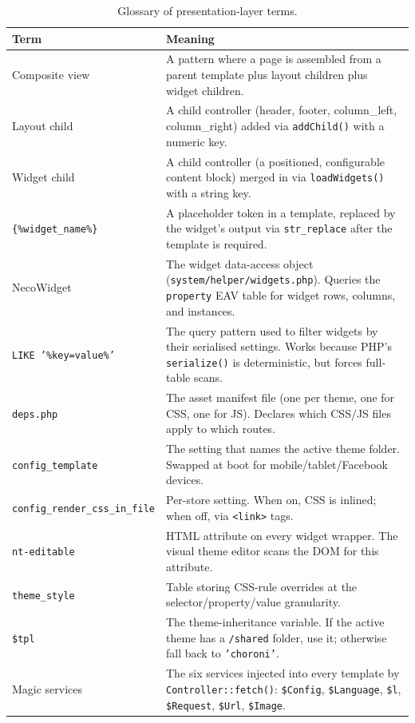 \documentclass[11pt,a4paper]{article}
\begin{document}
\begin{table}[htbp]
\centering
\caption{Glossary of presentation-layer terms.}\label{tab:glossary-v3}
\footnotesize\sloppy
\begin{tabularx}{\columnwidth}{>{\raggedright\arraybackslash}p{4.2cm}X}
\toprule
\textbf{Term} & \textbf{Meaning} \\
\midrule
Composite view & A pattern where a page is assembled from a parent template plus layout children plus widget children. \\
Layout child & A child controller (header, footer, column\_left, column\_right) added via \texttt{addChild()} with a numeric key. \\
Widget child & A child controller (a positioned, configurable content block) merged in via \texttt{loadWidgets()} with a string key. \\
\texttt{\{\%widget\_name\%\}} & A placeholder token in a template, replaced by the widget's output via \texttt{str\_replace} after the template is required. \\
NecoWidget & The widget data-access object (\texttt{system/helper/widgets.php}). Queries the \texttt{property} EAV table for widget rows, columns, and instances. \\
\texttt{LIKE '\%key=value\%'} & The query pattern used to filter widgets by their serialised settings. Works because PHP's \texttt{serialize()} is deterministic, but forces full-table scans. \\
\texttt{deps.php} & The asset manifest file (one per theme, one for CSS, one for JS). Declares which CSS/JS files apply to which routes. \\
\texttt{config\_template} & The setting that names the active theme folder. Swapped at boot for mobile/tablet/Facebook devices. \\
\texttt{config\_render\_css\_in\_file} & Per-store setting. When on, CSS is inlined; when off, via \texttt{<link>} tags. \\
\texttt{nt-editable} & HTML attribute on every widget wrapper. The visual theme editor scans the DOM for this attribute. \\
\texttt{theme\_style} & Table storing CSS-rule overrides at the selector/property/value granularity. \\
\texttt{\$tpl} & The theme-inheritance variable. If the active theme has a \texttt{/shared} folder, use it; otherwise fall back to \texttt{'choroni'}. \\
Magic services & The six services injected into every template by \texttt{Controller::fetch()}: \texttt{\$Config}, \texttt{\$Language}, \texttt{\$l}, \texttt{\$Request}, \texttt{\$Url}, \texttt{\$Image}. \\
\bottomrule
\end{tabularx}
\end{table}
\end{document}
